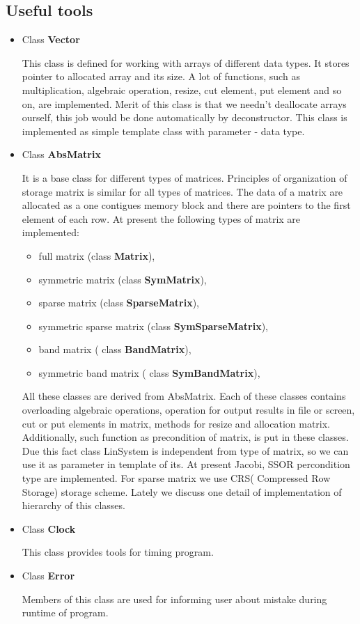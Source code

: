 \subsection{ Useful tools }
\begin{itemize}
\item{ Class {\bf Vector}} \\
\begin{print}
 This class is defined for working with arrays of different data types. It stores pointer to allocated array and its size. A lot of functions, such as multiplication, algebraic operation, resize, cut element, put element and so on, are implemented. Merit of this class is that we needn't deallocate arrays ourself, this job would be done automatically by deconstructor. This class is implemented as simple template class with parameter - data type.  
\end{print}
%
\item{ Class {\bf AbsMatrix}} \\
\begin{print}
 It is a base class for different types of matrices. Principles of organization of storage matrix is similar for all types of matrices. The data of a matrix are allocated as a one contigues memory block and there are pointers to the first element of each row. At present the following types of matrix are implemented: 
 \begin{itemize}
 \item[-] full matrix (class {\bf Matrix}), 
 \item[-] symmetric matrix (class {\bf SymMatrix}), 
 \item[-] sparse matrix (class {\bf SparseMatrix}), 
 \item[-] symmetric sparse matrix (class {\bf SymSparseMatrix}), 
 \item[-] band matrix ( class {\bf BandMatrix}), 
 \item[-] symmetric band matrix ( class {\bf SymBandMatrix}), 
 \end{itemize}
All these classes are derived from AbsMatrix. Each of these classes contains overloading algebraic operations, operation for output results in file or screen, cut or put elements in matrix, methods for resize and allocation matrix. Additionally, such function as precondition of matrix, is put in these classes. Due this fact class {\sf LinSystem} is independent from type of matrix, so we can use it as parameter in template of its.  At present Jacobi, 
SSOR percondition type are implemented.
 For sparse matrix we use CRS( Compressed Row Storage) storage scheme.
Lately we discuss one detail of implementation of hierarchy of this classes.
\end{print}
%
\item{ Class {\bf Clock}}\\
\begin{print}
 This class provides tools for timing program.
\end{print}
\item{ Class {\bf Error}}\\
\begin{print}
 Members of this class are used for informing user about mistake during runtime of program. 
\end{print}
\end{itemize}
